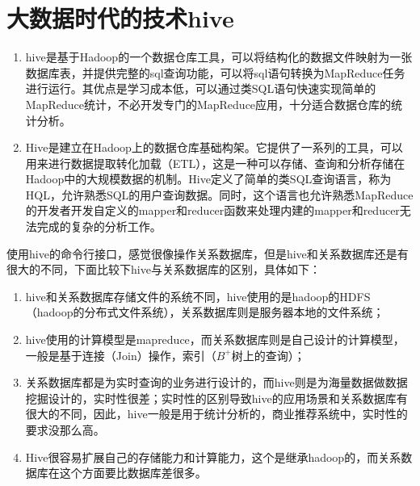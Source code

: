 \section{大数据时代的技术hive}
\begin{enumerate}[(1)]
\item hive是基于Hadoop的一个数据仓库工具，可以将结构化的数据文件映射为一张数据库表，并提供完整的sql查询功能，可以将sql语句转换为MapReduce任务进行运行。其优点是学习成本低，可以通过类SQL语句快速实现简单的MapReduce统计，不必开发专门的MapReduce应用，十分适合数据仓库的统计分析。
\item Hive是建立在Hadoop上的数据仓库基础构架。它提供了一系列的工具，可以用来进行数据提取转化加载（ETL），这是一种可以存储、查询和分析存储在Hadoop中的大规模数据的机制。Hive定义了简单的类SQL查询语言，称为HQL，允许熟悉SQL的用户查询数据。同时，这个语言也允许熟悉MapReduce的开发者开发自定义的mapper和reducer函数来处理内建的mapper和reducer无法完成的复杂的分析工作。
\end{enumerate}
\par 使用hive的命令行接口，感觉很像操作关系数据库，但是hive和关系数据库还是有很大的不同，下面比较下hive与关系数据库的区别，具体如下：
\begin{enumerate}[(1)]
\item hive和关系数据库存储文件的系统不同，hive使用的是hadoop的HDFS（hadoop的分布式文件系统），关系数据库则是服务器本地的文件系统；
\item hive使用的计算模型是mapreduce，而关系数据库则是自己设计的计算模型，一般是基于连接（Join）操作，索引（$B^+$树上的查询）；
\item 关系数据库都是为实时查询的业务进行设计的，而hive则是为海量数据做数据挖掘设计的，实时性很差；实时性的区别导致hive的应用场景和关系数据库有很大的不同，因此，hive一般是用于统计分析的，商业推荐系统中，实时性的要求没那么高。
\item Hive很容易扩展自己的存储能力和计算能力，这个是继承hadoop的，而关系数据库在这个方面要比数据库差很多。
\end{enumerate}
